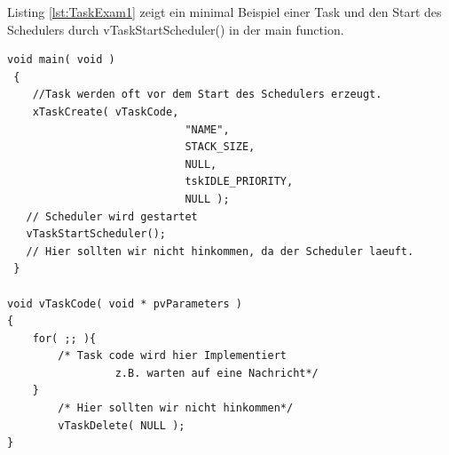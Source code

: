 Listing \ref{lst:TaskExam1} zeigt ein minimal Beispiel einer Task und den Start des Schedulers durch vTaskStartScheduler() in der main function. 
\begin{lstlisting}[caption={Minimal Beispiel für die Definition eine Task. }, linewidth=8cm,captionpos=b, label=lst:TaskExam1, float=hbt]
 void main( void )
 {
	//Task werden oft vor dem Start des Schedulers erzeugt.
	xTaskCreate( vTaskCode,
							"NAME",
							STACK_SIZE,
							NULL,
							tskIDLE_PRIORITY,
							NULL );
   // Scheduler wird gestartet
   vTaskStartScheduler();
   // Hier sollten wir nicht hinkommen, da der Scheduler laeuft.
 }

void vTaskCode( void * pvParameters )
{
    for( ;; ){
        /* Task code wird hier Implementiert
				 z.B. warten auf eine Nachricht*/
    }
		/* Hier sollten wir nicht hinkommen*/
		vTaskDelete( NULL );
}
\end{lstlisting}

